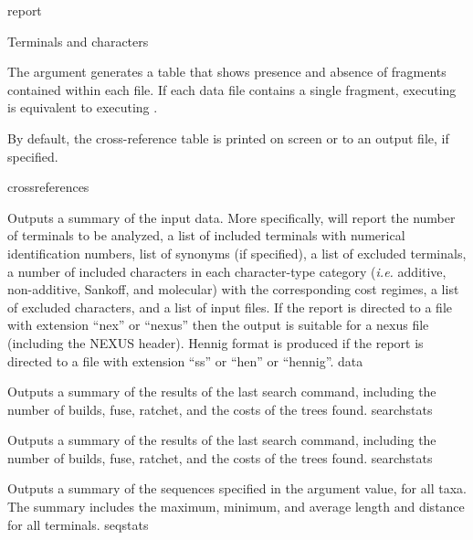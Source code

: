 \begin{command}{report}{}
\begin{arguments}
\begin{argumentgroup}{Terminals and characters}
{                The argument  generates
                a table that shows presence and absence of fragments contained
                within each file. If each data file contains a
                single fragment,  executing 
                is equivalent to executing .
                
                By default, the cross-reference table is printed on screen or to an
                output file, if specified.}
                {crossreferences}

                {Outputs a summary of the input data.
                More specifically, \poy will report the number of
                terminals to be analyzed, a list of included terminals with
                numerical identification numbers, list
                of synonyms (if specified), a list of excluded terminals, a
                number of included characters in each character-type category
                (\emph{i.e.} additive, non-additive, Sankoff, and molecular) with the corresponding
                cost regimes, a list of excluded
                characters, and a list of input files. If the report is directed
                to a file with extension ``nex'' or ``nexus'' then
                the output is suitable for a nexus file (including the NEXUS
                header). Hennig format is produced if the report is directed
                to a file with extension ``ss'' or ``hen'' or ``hennig''.}
                {data}

                {Outputs a summary of the results of the last search command,
                including the number of builds, fuse, ratchet, and the costs of
                the trees found.}
                {searchstats}

                {Outputs a summary of the results of the last search command,
                including the number of builds, fuse, ratchet, and the costs of
                the trees found.}
                {searchstats}

                {Outputs a summary of the sequences specified in the argument
                value, for all taxa. The summary includes the maximum, minimum,
                and average length and distance for all terminals.}
                {seqstats}


\end{argumentgroup}
\end{arguments}
\end{command}
